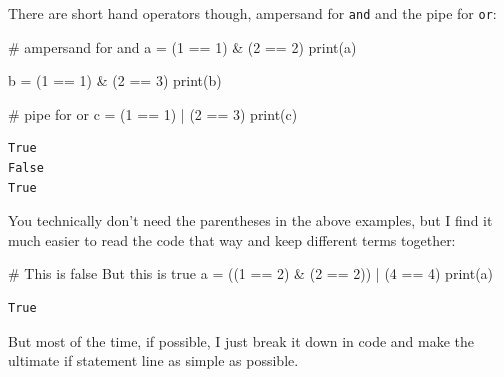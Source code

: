 \documentclass[
  letterpaper,
]{scrbook}
\newenvironment{Shaded}{\begin{snugshade}}{\end{snugshade}}
\newcommand{\BuiltInTok}[1]{\textcolor[rgb]{0.00,0.23,0.31}{#1}}
\newcommand{\CommentTok}[1]{\textcolor[rgb]{0.37,0.37,0.37}{#1}}
\newcommand{\DecValTok}[1]{\textcolor[rgb]{0.68,0.00,0.00}{#1}}
\newcommand{\NormalTok}[1]{\textcolor[rgb]{0.00,0.23,0.31}{#1}}
\newcommand{\OperatorTok}[1]{\textcolor[rgb]{0.37,0.37,0.37}{#1}}
\begin{document}
There are short hand operators though, ampersand for \texttt{and} and
the pipe for \texttt{or}:

\begin{Shaded}
\begin{Highlighting}[]
\CommentTok{\# ampersand for and}
\NormalTok{a }\OperatorTok{=}\NormalTok{ (}\DecValTok{1} \OperatorTok{==} \DecValTok{1}\NormalTok{) }\OperatorTok{\&}\NormalTok{ (}\DecValTok{2} \OperatorTok{==} \DecValTok{2}\NormalTok{)}
\BuiltInTok{print}\NormalTok{(a)}

\NormalTok{b }\OperatorTok{=}\NormalTok{ (}\DecValTok{1} \OperatorTok{==} \DecValTok{1}\NormalTok{) }\OperatorTok{\&}\NormalTok{ (}\DecValTok{2} \OperatorTok{==} \DecValTok{3}\NormalTok{)}
\BuiltInTok{print}\NormalTok{(b)}

\CommentTok{\# pipe for or}
\NormalTok{c }\OperatorTok{=}\NormalTok{ (}\DecValTok{1} \OperatorTok{==} \DecValTok{1}\NormalTok{) }\OperatorTok{|}\NormalTok{ (}\DecValTok{2} \OperatorTok{==} \DecValTok{3}\NormalTok{)}
\BuiltInTok{print}\NormalTok{(c)}
\end{Highlighting}
\end{Shaded}

\begin{verbatim}
True
False
True
\end{verbatim}

You technically don't need the parentheses in the above examples, but I
find it much easier to read the code that way and keep different terms
together:

\begin{Shaded}
\begin{Highlighting}[]
\CommentTok{\#       This is false        But this is true}
\NormalTok{a }\OperatorTok{=}\NormalTok{ ((}\DecValTok{1} \OperatorTok{==} \DecValTok{2}\NormalTok{) }\OperatorTok{\&}\NormalTok{ (}\DecValTok{2} \OperatorTok{==} \DecValTok{2}\NormalTok{)) }\OperatorTok{|}\NormalTok{ (}\DecValTok{4} \OperatorTok{==} \DecValTok{4}\NormalTok{)}
\BuiltInTok{print}\NormalTok{(a)}
\end{Highlighting}
\end{Shaded}

\begin{verbatim}
True
\end{verbatim}

But most of the time, if possible, I just break it down in code and make
the ultimate if statement line as simple as possible.
\end{document}
